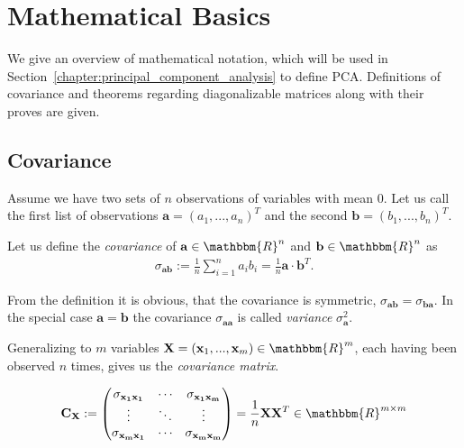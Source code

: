 \chapter{Mathematical Basics}
\label{chapter:mathematical_basics}

\color{change} We give an overview of mathematical notation, which will be used in Section~\ref{chapter:principal_component_analysis} to define PCA. Definitions of covariance and theorems regarding diagonalizable matrices along with their proves are given. \color{black}

\section{Covariance}
\label{sec:covariance}

Assume we have two sets of $n$ observations of variables with mean $0$. Let us call the first list of observations $\mathbf{a} = (a_1, ..., a_n)^T$ and the second $\mathbf{b} = (b_1, ..., b_n)^T$.

\begin{definition}[Covariance]
	Let us define the \textit{covariance} of $\mathbf{a} \in \mathbbm{R}^n$ and $\mathbf{b} \in \mathbbm{R}^n$ as
	\begin{align*}
		\sigma_{\mathbf{ab}} := \frac{1}{n} \sum_{i=1}^{n}a_ib_i = \frac{1}{n}\mathbf{a}\cdot\mathbf{b}^T.
	\end{align*}
\end{definition}

From the definition it is obvious, that the covariance is symmetric, $\sigma_{\mathbf{ab}} = \sigma_{\mathbf{ba}}$. In the special case $\mathbf{a} = \mathbf{b}$ the covariance $\sigma_{\mathbf{aa}}$ is called \textit{variance} $\sigma_{\mathbf{a}}^2$.

\begin{definition}
	Generalizing to $m$ variables $\mathbf{X} = (\mathbf{x}_1, ..., \mathbf{x}_m) \in \mathbbm{R}^m$, each having been observed $n$ times, gives us the \textit{covariance matrix}.
	
	\begin{align*}
		\mathbf{C_X} := \left(\begin{matrix}
			\sigma_{\mathbf{x_1x_1}}	& \cdots & \sigma_{\mathbf{x_1x_m}}	\\
			\vdots						& \ddots & \vdots					\\
			\sigma_{\mathbf{x_mx_1}}	& \cdots & \sigma_{\mathbf{x_mx_m}}	\\
		\end{matrix}\right) = \frac{1}{n} \mathbf{X}\mathbf{X}^T \in \mathbbm{R}^{m\times m}
	\end{align*}
\end{definition}

